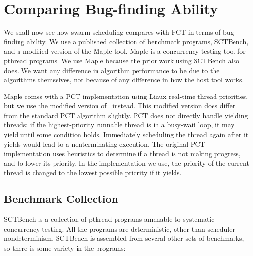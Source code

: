\section{Comparing Bug-finding Ability}
\label{sec:algorithms-eval}

We shall now see how swarm scheduling compares with PCT in terms of
bug-finding ability.  We use a published collection of benchmark
programs, SCTBench\cite{thomson2016,thomson2014}, and a modified
version of the Maple tool\cite{yu2012}.  Maple is a concurrency
testing tool for pthread\cite{ieee1995} programs.  We use Maple
because the prior work using SCTBench also does.  We want any
difference in algorithm performance to be due to the algorithms
themselves, not because of any difference in how the host tool works.

Maple comes with a PCT implementation using Linux real-time thread priorities,
but we use the modified version of~\cite{thomson2016} instead.  This modified
version does differ from the standard PCT algorithm slightly.  PCT does not
directly handle yielding threads: if the highest-priority runnable thread is in
a busy-wait loop, it may yield until some condition holds.  Immediately
scheduling the thread again after it yields would lead to a nonterminating
execution.  The original PCT implementation uses heuristics to determine if a
thread is not making progress, and to lower its priority\cite{burckhardt2010}.
In the implementation we use, the priority of the current thread is changed to
the lowest possible priority if it yields\cite{thomson2016}.

\subsection{Benchmark Collection}
\label{sec:algorithms-eval-sctbench}

SCTBench\cite{thomson2016,thomson2014} is a collection of pthread programs
amenable to systematic concurrency testing.  All the programs are deterministic,
other than scheduler nondeterminism.  SCTBench is assembled from several other
sets of benchmarks, so there is some variety in the programs:

